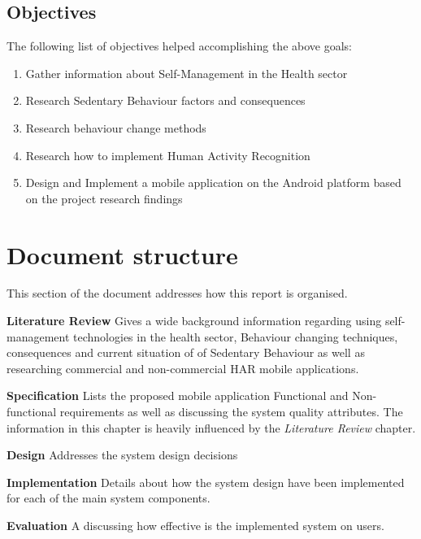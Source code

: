     \subsection*{Objectives}
    The following list of objectives helped accomplishing the above goals: 
    \begin{enumerate}
        \item Gather information about Self-Management in the Health sector
        \item Research Sedentary Behaviour factors and consequences
        \item Research behaviour change methods
        \item Research how to implement Human Activity Recognition 
        \item Design and Implement a mobile application on the Android platform based on the project research findings
    \end{enumerate}
    
    \section{Document structure}
    This section of the document addresses how this report is organised.\newline
    
    \textbf{Literature Review} Gives a wide background information regarding using self-management technologies in the health sector, Behaviour changing techniques, consequences and current situation of of Sedentary Behaviour as well as researching commercial and non-commercial HAR mobile applications.\newline
    
    
    \textbf{Specification} Lists the proposed mobile application Functional and Non-functional requirements as well as discussing the system quality attributes. The information in this chapter is heavily influenced by the \textit{Literature Review} chapter.\newline
    
    
    \textbf{Design} Addresses the system design decisions\newline
    
    
    \textbf{Implementation} Details about how the system design have been implemented for each of the main system components.\newline
    
    
    \textbf{Evaluation} A discussing how effective is the implemented system on users.\newline
    
